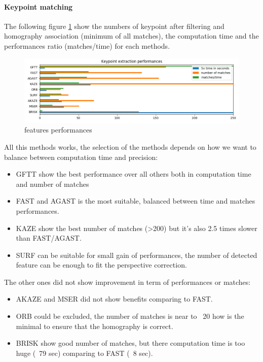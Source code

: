 \documentclass[]{elsarticle}
\begin{document}
	\paragraph{Keypoint matching} 
	The following figure \ref{fig:features-performances} show the numbers of keypoint after filtering and homography association (minimum of all matches),
	the computation time and the performances ratio (matches/time) for each methods.
	
	\begin{figure}[!htb]
		\centering
		\includegraphics[width=\linewidth]{../figures/comparaison-keypoint-performances.png}
		\caption{features performances}
		\label{fig:features-performances}
	\end{figure}
	
	\noindent
	All this methods works, the selection of the methods depends on how we want to balance between computation time and precision:
	\begin{itemize}
		\item GFTT show the best performance over all others both in computation time and number of matches
		\item FAST and AGAST is the most suitable, balanced between time and matches performances.
		\item KAZE show the best number of matches (>200) but it's also 2.5 times slower than FAST/AGAST.
		\item SURF can be suitable for small gain of performances, the number of detected feature can be enough to fit the perspective correction.
	\end{itemize}
	
	\noindent
	The other ones did not show improvement in term of performances or matches:
	\begin{itemize}
		\item AKAZE and MSER did not show benefits comparing to FAST.
		\item ORB could be excluded, the number of matches is near to ~20 how is the minimal to ensure that the homography is correct.
		\item BRISK show good number of matches, but there computation time is too huge (~79 sec) comparing to FAST (~8 sec).
	\end{itemize}
	
\end{document}

